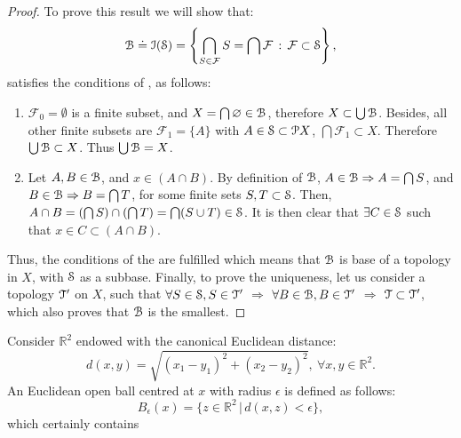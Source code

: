 \begin{proof}
	To prove this result we will show that:
	$$
	\B\doteq \I(\S)=\left\{\bigcap\limits_{S\in\mathcal{F}} S=\bigcap\mathcal{F}\,:\,\mathcal{F}\subset \S\right\},
	$$
	satisfies the conditions of , as follows:
	\begin{enumerate}
		\item $\mathcal{F}_{0}=\emptyset$ is a finite subset, and $X=\bigcap \emptyset\in\B$, therefore $X\subset
		\bigcup\B$. Besides, all other finite subsets are $\mathcal{F}_{1}=\{A\}$ with $A\in\S
		\subset\P X$, $\bigcap\mathcal{F}_{1}\subset X$. Therefore $\bigcup \B\subset X$. Thus $\bigcup\B = X$.
		\item Let $A, B\in \B$, and $x\in (A\cap B)$. By definition of $\B$, $A\in\B \Rightarrow A=\bigcap S$,
		and $B\in \B \Rightarrow B =\bigcap T$, for some finite sets $S, T\subset \S$.
		Then, $A\cap B = (\bigcap S)\cap(\bigcap T)=\bigcap(S\cup T)\in \S$.
		It is then clear that $\exists C\in\S$ such that $x\in C\subset (A\cap B)$.
	\end{enumerate}
	Thus, the conditions of the  are fulfilled which means that
	$\B$ is base of a topology in $X$, with $\S$ as a subbase.
	Finally, to prove the uniqueness, let us consider a topology $\T'$ on $X$, 
	such that $\forall S\in \S, S\in \T'$ $\Rightarrow$ $\forall B\in\B, B\in\T'$ 
	$\Rightarrow$ $\T\subset \T'$, which also proves that $\B$ is the smallest.
\end{proof}


\begin{example}
	Consider $\mathbb{R}^2$ endowed with the canonical Euclidean distance:
	$$
	d(x,y) =\sqrt{(x_1-y_1)^2+(x_2-y_2)^2},\ \forall x,y \in \mathbb{R}^2.
	$$ 
	An Euclidean open ball centred at $x$ with radius $\epsilon$ is defined as follows: 
	$$
	B_\epsilon(x) = \{z\in\mathbb{R}^2\,|\,d(x,z)<\epsilon\},
	$$ 
	which certainly contains 
\end{example}

